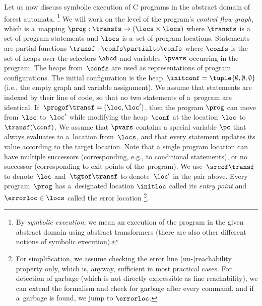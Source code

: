 Let us now discuss symbolic execution of C programs in the abstract domain of forest automata.%
\footnote{By \emph{symbolic execution}, we mean an execution of the program
in the given abstract domain using abstract transformers (there are also other
different notions of symbolic execution).}
%
We will work on the level of the program's \emph{control flow graph},
which is a~mapping $\prog: \transfs \to (\locs \times \locs)$ where $\transfs$ is a set of
program statements and $\locs$ is a~set of program locations.
Statements are partial functions $\transf:\confs\partialto\confs$ where
$\confs$ is the set of heaps over the selectors $\abcd$ and variables~$\pvars$
occurring in the program.
The heaps from~$\confs$ are used as representations of program configurations.
The initial configuration is the heap~$\initconf =
\tuple{\emptyset,\emptyset,\emptyset}$ (i.e., the empty graph and variable assignment).
%
%
%
We assume that statements are indexed by their line of code, so that no two
statements of a~program are identical.
%
If~$\progof \transf = (\loc, \loc')$,
then the program $\prog$ can move from~$\loc$ to~$\loc'$ while modifying 
the heap~$\conf$ at the location~$\loc$ to~$\transf(\conf)$. 
%
We assume that $\pvars$ contains a special variable $\pc$ that always evaluates
to a~location from~$\locs$, and that every statement updates its value
according to the target location.
%
%
%
Note that a single program location can have multiple successors
(corresponding, e.g., to conditional statements), or no successor
(corresponding to exit points of the~program).
%
We use~$\srcof \transf$ to denote~$\loc$ and~$\tgtof \transf$ to
denote~$\loc'$ in the pair above.
Every program~$\prog$ has a~designated location $\initloc$ called its
\emph{entry point}
and $\errorloc\in\locs$ called the error location%
\footnote{
For simplification, we assume checking the error line (un-)reachability property
only,
which is, anyway, sufficient in most practical cases.
For detection of garbage (which is not directly expressible as line
reachability), we can extend the formalism and check for garbage after every
command, and if a~garbage is found, we jump to $\errorloc$.
}.


